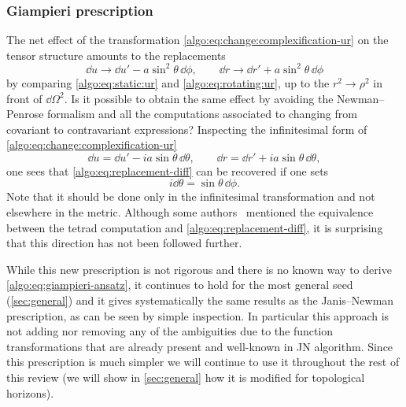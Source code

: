 \subsubsection{Giampieri prescription}


The net effect of the transformation \eqref{algo:eq:change:complexification-ur} on the tensor structure amounts to the replacements
\begin{equation}
	\label{algo:eq:replacement-diff}
	\dd u \longrightarrow \dd u' - a \sin^2 \theta\, \dd \phi, \qquad
	\dd r \longrightarrow \dd r' + a \sin^2 \theta\, \dd \phi
\end{equation} 
by comparing \eqref{algo:eq:static:ur} and \eqref{algo:eq:rotating:ur}, up to the $r^2 \to \rho^2$ in front of $\dd\Omega^2$.
Is it possible to obtain the same effect by avoiding the Newman--Penrose formalism and all the computations associated to changing from covariant to contravariant expressions?
Inspecting the infinitesimal form of \eqref{algo:eq:change:complexification-ur}
\begin{equation}
	\dd u = \dd u' - i a \sin \theta\, \dd \theta, \qquad
	\dd r = \dd r' + i a \sin \theta\, \dd \theta,
\end{equation} 
one sees that \eqref{algo:eq:replacement-diff} can be recovered if one sets~\cite{Giampieri:1990:IntroducingAngularMomentum}
\begin{equation}
	\label{algo:eq:giampieri-ansatz}
	i \dd \theta = \sin \theta\, \dd\phi.
\end{equation} 
Note that it should be done only in the infinitesimal transformation and not elsewhere in the metric.
Although some authors~\cite{Ibohal:2005:RotatingMetricsAdmitting, Ferraro:2014:UntanglingNewmanJanisAlgorithm} mentioned the equivalence between the tetrad computation and \eqref{algo:eq:replacement-diff}, it is surprising that this direction has not been followed further.

While this new prescription is not rigorous and there is no known way to derive \eqref{algo:eq:giampieri-ansatz}, it continues to hold for the most general seed (\cref{sec:general}) and it gives systematically the same results as the Janis--Newman prescription, as can be seen by simple inspection.
In particular this approach is not adding nor removing any of the ambiguities due to the function transformations that are already present and well-known in JN algorithm.
Since this prescription is much simpler we will continue to use it throughout the rest of this review (we will show in \cref{sec:general} how it is modified for topological horizons).

